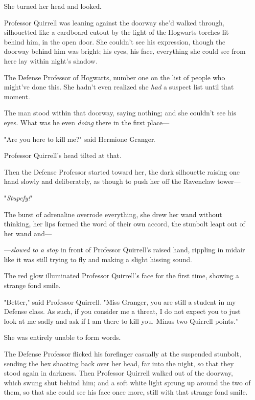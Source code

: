 She turned her head and looked.

Professor Quirrell was leaning against the doorway she'd walked through, 
silhouetted like a cardboard cutout by the light of the Hogwarts torches lit 
behind him, in the open door. She couldn't see his expression, though the 
doorway behind him was bright; his eyes, his face, everything she could see 
from here lay within night's shadow.

The Defense Professor of Hogwarts, number one on the list of people who 
might've done this. She hadn't even realized she \emph{had} a suspect list 
until that moment.

The man stood within that doorway, saying nothing; and she couldn't see his 
eyes. What was he even \emph{doing} there in the first place---

"Are you here to kill me?" said Hermione Granger.

Professor Quirrell's head tilted at that.

Then the Defense Professor started toward her, the dark silhouette raising one 
hand slowly and deliberately, as though to push her off the Ravenclaw tower---

"\emph{Stupefy!}"

The burst of adrenaline overrode everything, she drew her wand without 
thinking, her lips formed the word of their own accord, the stunbolt leapt out 
of her wand and---

---\emph{slowed to a stop} in front of Professor Quirrell's raised hand, 
rippling in midair like it was still trying to fly and making a slight hissing 
sound.

The red glow illuminated Professor Quirrell's face for the first time, showing 
a strange fond smile.

"Better," said Professor Quirrell. "Miss Granger, you are still a student in my 
Defense class. As such, if you consider me a threat, I do not expect you to 
just look at me sadly and ask if I am there to kill you. Minus two Quirrell 
points."

She was entirely unable to form words.

The Defense Professor flicked his forefinger casually at the suspended 
stunbolt, sending the hex shooting back over her head, far into the night, so 
that they stood again in darkness. Then Professor Quirrell walked out of the 
doorway, which swung shut behind him; and a soft white light sprung up around 
the two of them, so that she could see his face once more, still with that 
strange fond smile.


